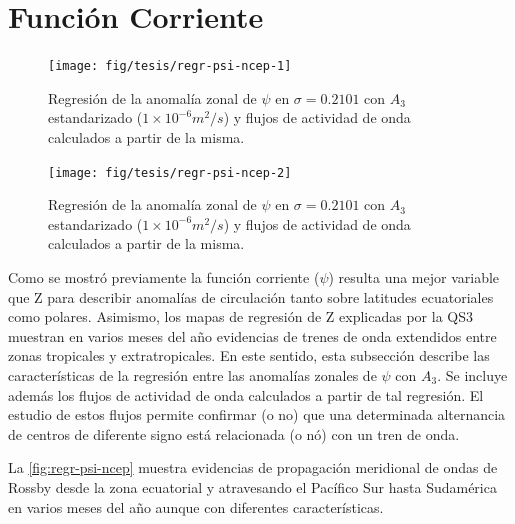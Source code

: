 \documentclass[spanish,a4paper,12pt,oneside]{book}
\begin{document}
\section*{Función Corriente}

\begin{landscape}\begin{figure}

{\centering \texttt{[image: fig/tesis/regr-psi-ncep-1]} 

}

\caption{Regresión de la anomalía zonal de $\psi$ en $\sigma = 0.2101$ con $A_3$ estandarizado ($1\times10^{-6}m^2/s$) y flujos de actividad de onda calculados a partir de la misma.}\label{fig:regr-psi-ncep1}
\end{figure}
\begin{figure}

{\centering \texttt{[image: fig/tesis/regr-psi-ncep-2]} 

}

\caption{Regresión de la anomalía zonal de $\psi$ en $\sigma = 0.2101$ con $A_3$ estandarizado ($1\times10^{-6}m^2/s$) y flujos de actividad de onda calculados a partir de la misma.}\label{fig:regr-psi-ncep2}
\end{figure}
\end{landscape}

Como se mostró previamente la función corriente (\(\psi\)) resulta una
mejor variable que Z para describir anomalías de circulación tanto sobre
latitudes ecuatoriales como polares. Asimismo, los mapas de regresión de
Z explicadas por la QS3 muestran en varios meses del año evidencias de
trenes de onda extendidos entre zonas tropicales y extratropicales. En
este sentido, esta subsección describe las características de la
regresión entre las anomalías zonales de \(\psi\) con \(A_3\). Se
incluye además los flujos de actividad de onda calculados a partir de
tal regresión. El estudio de estos flujos permite confirmar (o no) que
una determinada alternancia de centros de diferente signo está
relacionada (o nó) con un tren de onda.

La \autoref{fig:regr-psi-ncep} muestra evidencias de propagación
meridional de ondas de Rossby desde la zona ecuatorial y atravesando el
Pacífico Sur hasta Sudamérica en varios meses del año aunque con
diferentes características.
\end{document}
